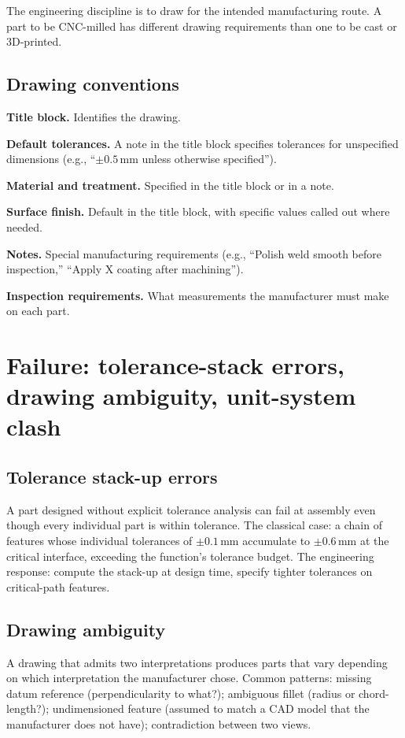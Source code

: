 The engineering discipline is to draw for the intended manufacturing route. A part to be CNC-milled has different drawing requirements than one to be cast or 3D-printed.

\subsection{Drawing conventions}

\textbf{Title block.} Identifies the drawing.

\textbf{Default tolerances.} A note in the title block specifies tolerances for unspecified dimensions (e.g., ``$\pm 0.5\,\si{\milli\meter}$ unless otherwise specified'').

\textbf{Material and treatment.} Specified in the title block or in a note.

\textbf{Surface finish.} Default in the title block, with specific values called out where needed.

\textbf{Notes.} Special manufacturing requirements (e.g., ``Polish weld smooth before inspection,'' ``Apply X coating after machining'').

\textbf{Inspection requirements.} What measurements the manufacturer must make on each part.

\section{Failure: tolerance-stack errors, drawing ambiguity, unit-system clash}

\subsection{Tolerance stack-up errors}

A part designed without explicit tolerance analysis can fail at assembly even though every individual part is within tolerance. The classical case: a chain of features whose individual tolerances of $\pm 0.1\,\si{\milli\meter}$ accumulate to $\pm 0.6\,\si{\milli\meter}$ at the critical interface, exceeding the function's tolerance budget. The engineering response: compute the stack-up at design time, specify tighter tolerances on critical-path features.

\subsection{Drawing ambiguity}

A drawing that admits two interpretations produces parts that vary depending on which interpretation the manufacturer chose. Common patterns: missing datum reference (perpendicularity to what?); ambiguous fillet (radius or chord-length?); undimensioned feature (assumed to match a CAD model that the manufacturer does not have); contradiction between two views.


